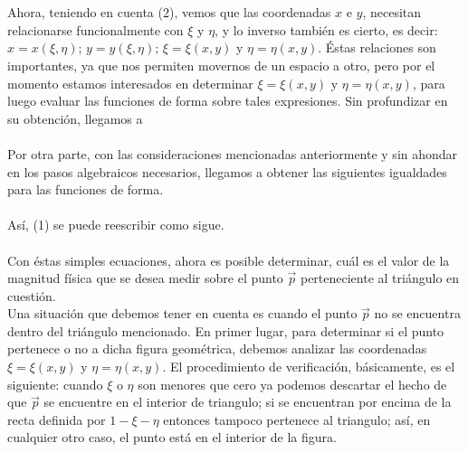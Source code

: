 \\
\\
Ahora, teniendo en cuenta (2), vemos que las coordenadas $x$ e $y$, necesitan relacionarse funcionalmente con  $\xi$ y $\eta$, y lo inverso también es cierto, es decir: $x=x( \xi, \eta)$; $y=y( \xi, \eta)$; $\xi= \xi(x,y)$ y $\eta= \eta(x,y)$. Éstas relaciones son importantes, ya que nos permiten movernos de un espacio a otro, pero por el momento estamos interesados en determinar $\xi= \xi(x,y)$ y $\eta= \eta(x,y)$, para luego evaluar las funciones de forma sobre tales expresiones. Sin profundizar en su obtención, llegamos a
\\ 
\\
Por otra parte, con las consideraciones mencionadas anteriormente y sin ahondar en los pasos algebraicos necesarios, llegamos a obtener las siguientes igualdades para las funciones de forma.
\\
\\
Así, (1) se puede reescribir como sigue.
\\
\\

Con éstas simples ecuaciones, ahora es posible determinar, cuál es el valor de la magnitud física que se desea medir sobre el punto $\vec{p}$ perteneciente al triángulo en cuestión.
\\
Una situación que debemos tener en cuenta es cuando el punto $\vec{p}$ no se encuentra dentro del triángulo mencionado. En primer lugar, para determinar si el punto pertenece o no a dicha figura geométrica, debemos analizar las coordenadas $\xi= \xi(x,y)$ y $\eta= \eta(x,y)$. El procedimiento de verificación, básicamente, es el siguiente: cuando $\xi$ o $\eta$ son menores que cero ya podemos descartar el hecho de que $\vec{p}$ se encuentre en el interior de triangulo; si se encuentran por encima de la recta definida por $1-\xi-\eta$ entonces tampoco pertenece al triangulo; así, en cualquier otro caso, el punto está en el interior de la figura. 



